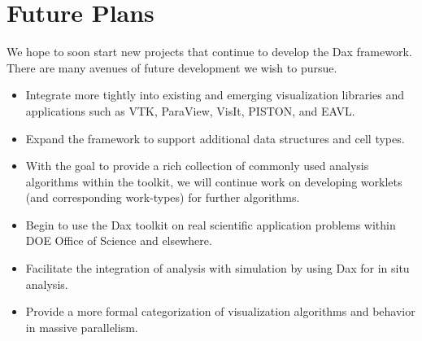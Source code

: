 \section{Future Plans}

We hope to soon start new projects that continue to develop the Dax
framework. There are many avenues of future development we wish to pursue.

\begin{itemize}
\item Integrate more tightly into existing and emerging visualization
  libraries and applications such as VTK, ParaView, VisIt, PISTON, and
  EAVL.
\item Expand the framework to support additional data structures and cell
  types.
\item With the goal to provide a rich collection of commonly used analysis
  algorithms within the toolkit, we will continue work on developing
  worklets (and corresponding work-types) for further algorithms.
\item Begin to use the Dax toolkit on real scientific application problems
  within DOE Office of Science and elsewhere.
\item Facilitate the integration of analysis with simulation by using Dax
  for in situ analysis.
\item Provide a more formal categorization of visualization algorithms and
  behavior in massive parallelism.
\end{itemize}
